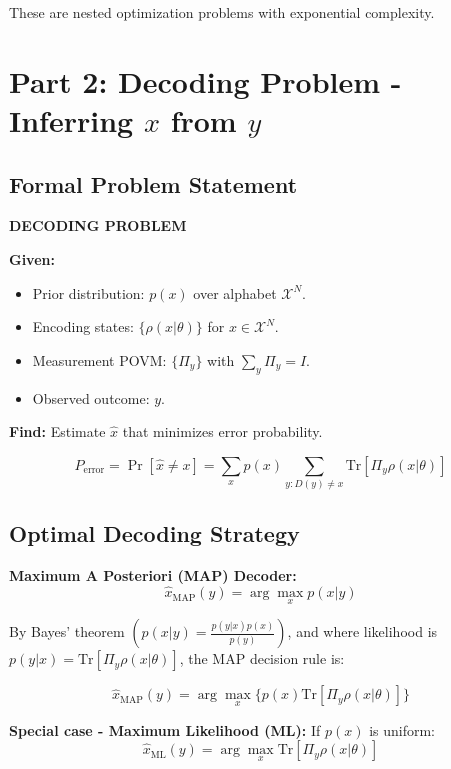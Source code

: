 \documentclass[11pt,a4paper]{article}
\begin{document}
These are nested optimization problems with exponential complexity.

\section{Part 2: Decoding Problem - Inferring $x$ from $y$}

\subsection{Formal Problem Statement}

\textbf{DECODING PROBLEM}

\textbf{Given:}
\begin{itemize}
    \item Prior distribution: $p(x)$ over alphabet $\mathcal{X}^N$.
    \item Encoding states: $\{\rho(x|\theta)\}$ for $x \in \mathcal{X}^N$.
    \item Measurement POVM: $\{\Pi_y\}$ with $\sum_y \Pi_y = I$.
    \item Observed outcome: $y$.
\end{itemize}

\textbf{Find:} Estimate $\hat{x}$ that minimizes error probability.

\begin{equation}
P_{\text{error}} = \Pr[\hat{x} \neq x] = \sum_x p(x) \sum_{y:D(y)\neq x} \text{Tr}[\Pi_y \rho(x|\theta)]
\end{equation}

\subsection{Optimal Decoding Strategy}

\textbf{Maximum A Posteriori (MAP) Decoder:}
\begin{equation}
\hat{x}_{\text{MAP}}(y) = \arg\max_x p(x|y)
\end{equation}

By Bayes' theorem $\left(p(x|y) = \frac{p(y|x)p(x)}{p(y)}\right)$, and where likelihood is $p(y|x) = \text{Tr}[\Pi_y\rho(x|\theta)]$, the MAP decision rule is:

\begin{equation}
\hat{x}_{\text{MAP}}(y) = \arg\max_x \{p(x)\text{Tr}[\Pi_y\rho(x|\theta)]\}
\end{equation}

\textbf{Special case - Maximum Likelihood (ML):} If $p(x)$ is uniform:
\begin{equation}
\hat{x}_{\text{ML}}(y) = \arg\max_x \text{Tr}[\Pi_y\rho(x|\theta)]
\end{equation}
\end{document}
